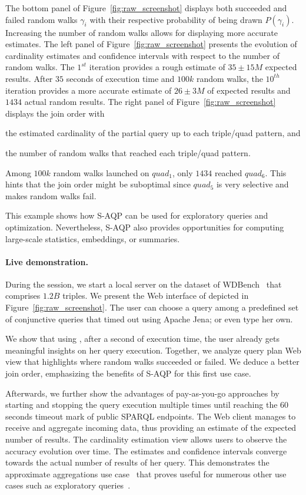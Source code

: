 \noindent The bottom panel of Figure~\ref{fig:raw_screenshot} displays
both succeeded and failed random walks $\gamma_i$ with their
respective probability of being drawn $P(\gamma_i)$.  Increasing the
number of random walks allows for displaying more accurate estimates.  The
left panel of Figure~\ref{fig:raw_screenshot} presents the evolution
of cardinality estimates and confidence intervals with respect to the
number of random walks.  The $1^{st}$ iteration provides a rough
estimate of $35 \pm 15M$ expected results. After $35$ seconds of
execution time and $100k$ random walks, the $10^{th}$ iteration
provides a more accurate estimate of $26 \pm 3M$ of expected results and $1434$ actual random results.
%
The right panel of Figure~\ref{fig:raw_screenshot} displays
the join order with
\begin{inparaenum}[(i)]
\item the estimated cardinality of the partial query up to each
  triple/quad pattern, and
\item the number of random walks that reached each triple/quad pattern.
\end{inparaenum}
Among $100k$ random walks launched on $quad_1$, only $1434$ reached
$quad_6$. This hints that the join order might be suboptimal since
$quad_5$ is very selective and makes random walks fail.


\noindent This example shows how S-AQP can be used for exploratory
queries and optimization. Nevertheless, S-AQP also provides
opportunities for computing large-scale statistics, embeddings, or
summaries.


\paragraph{Live demonstration.}
During the session, we start a local \NAME server on the dataset of
WDBench~\cite{angles2022wdbench} that comprises $1.2B$ triples.  We
present the Web interface of \NAME depicted in
Figure~\ref{fig:raw_screenshot}. The user can choose a query among a
predefined set of conjunctive queries that timed out using Apache
Jena; or even type her own.

\noindent We show that using \NAME, after a second of execution time,
the user already gets meaningful insights on her query
execution. Together, we analyze query plan Web view that highlights
where random walks succeeded or failed. We deduce a better join order,
emphasizing the benefits of S-AQP for this first use case.

\noindent Afterwards, we further show the advantages of pay-as-you-go
approaches by starting and stopping the query execution multiple times
until reaching the $60$ seconds timeout mark of public SPARQL
endpoints.  The Web client manages to receive and aggregate incoming
data, thus providing an estimate of the expected number of
results. The cardinality estimation view allows users to observe the
accuracy evolution over time. The estimates and confidence intervals
converge towards the actual number of results of her query. This
demonstrates the approximate aggregations use
case~\cite{wang2022approximate} that proves useful for numerous other
use cases such as exploratory
queries~\cite{DBLP:conf/sigmod/AgarwalMKTJMMS14}.

